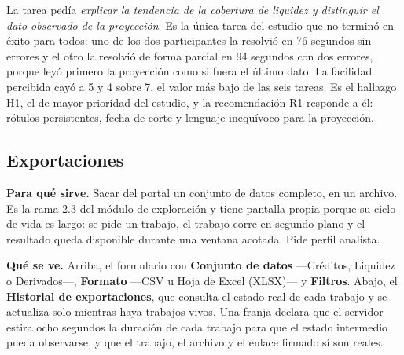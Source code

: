 
\begin{uxnota}
La tarea pedía \emph{explicar la tendencia de la cobertura de liquidez y distinguir el dato
observado de la proyección}. Es la única tarea del estudio que no terminó en éxito para todos: uno
de los dos participantes la resolvió en 76 segundos sin errores y el otro la resolvió de forma
parcial en 94 segundos con dos errores, porque leyó primero la proyección como si fuera el último
dato. La facilidad percibida cayó a 5 y 4 sobre 7, el valor más bajo de las seis tareas. Es el
hallazgo H1, el de mayor prioridad del estudio, y la recomendación R1 responde a él: rótulos
persistentes, fecha de corte y lenguaje inequívoco para la proyección.
\end{uxnota}

\clearpage
\subsection{Exportaciones}

\textbf{Para qué sirve.} Sacar del portal un conjunto de datos completo, en un archivo. Es la
rama 2.3 del módulo de exploración y tiene pantalla propia porque su ciclo de vida es largo: se
pide un trabajo, el trabajo corre en segundo plano y el resultado queda disponible durante una
ventana acotada. Pide perfil analista.

\textbf{Qué se ve.} Arriba, el formulario con \textbf{Conjunto de datos} ---Créditos, Liquidez o
Derivados---, \textbf{Formato} ---CSV u Hoja de Excel (XLSX)--- y \textbf{Filtros}. Abajo, el
\textbf{Historial de exportaciones}, que consulta el estado real de cada trabajo y se actualiza
solo mientras haya trabajos vivos. Una franja declara que el servidor estira ocho segundos la
duración de cada trabajo para que el estado intermedio pueda observarse, y que el trabajo, el
archivo y el enlace firmado sí son reales.


